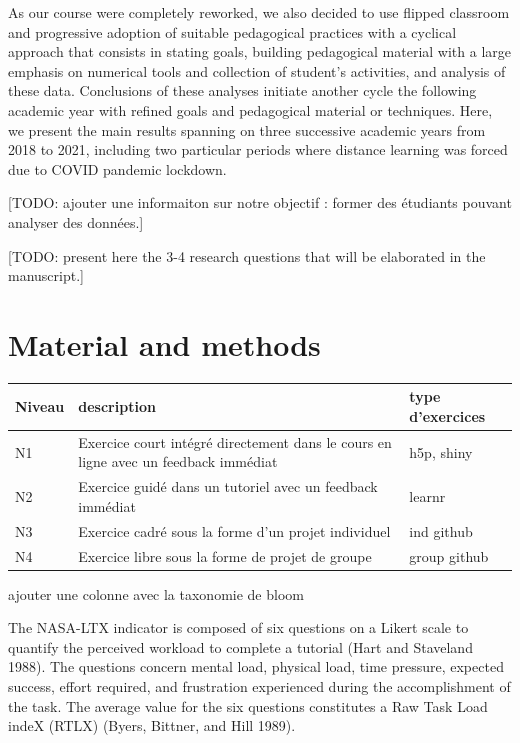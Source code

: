 \documentclass[
]{article}
\begin{document}
As our course were completely reworked, we also decided to use flipped
classroom and progressive adoption of suitable pedagogical practices
with a cyclical approach that consists in stating goals, building
pedagogical material with a large emphasis on numerical tools and
collection of student's activities, and analysis of these data.
Conclusions of these analyses initiate another cycle the following
academic year with refined goals and pedagogical material or techniques.
Here, we present the main results spanning on three successive academic
years from 2018 to 2021, including two particular periods where distance
learning was forced due to COVID pandemic lockdown.

{[}TODO: ajouter une informaiton sur notre objectif : former des
étudiants pouvant analyser des données.{]}

{[}TODO: present here the 3-4 research questions that will be elaborated
in the manuscript.{]}

\hypertarget{material-and-methods}{%
\section{Material and methods}\label{material-and-methods}}

\begin{longtable}[]{@{}
  >{\raggedright\arraybackslash}p{}
  >{\raggedright\arraybackslash}p{}
  >{\raggedright\arraybackslash}p{}@{}}
\toprule
Niveau & description & type d'exercices \\
\midrule
\endhead
N1 & Exercice court intégré directement dans le cours en ligne avec un
feedback immédiat & h5p, shiny \\
N2 & Exercice guidé dans un tutoriel avec un feedback immédiat &
learnr \\
N3 & Exercice cadré sous la forme d'un projet individuel & ind github \\
N4 & Exercice libre sous la forme de projet de groupe & group github \\
\bottomrule
\end{longtable}

ajouter une colonne avec la taxonomie de bloom

The NASA-LTX indicator is composed of six questions on a Likert scale to
quantify the perceived workload to complete a tutorial (Hart and
Staveland 1988). The questions concern mental load, physical load, time
pressure, expected success, effort required, and frustration experienced
during the accomplishment of the task. The average value for the six
questions constitutes a Raw Task Load indeX (RTLX) (Byers, Bittner, and
Hill 1989).
\end{document}
